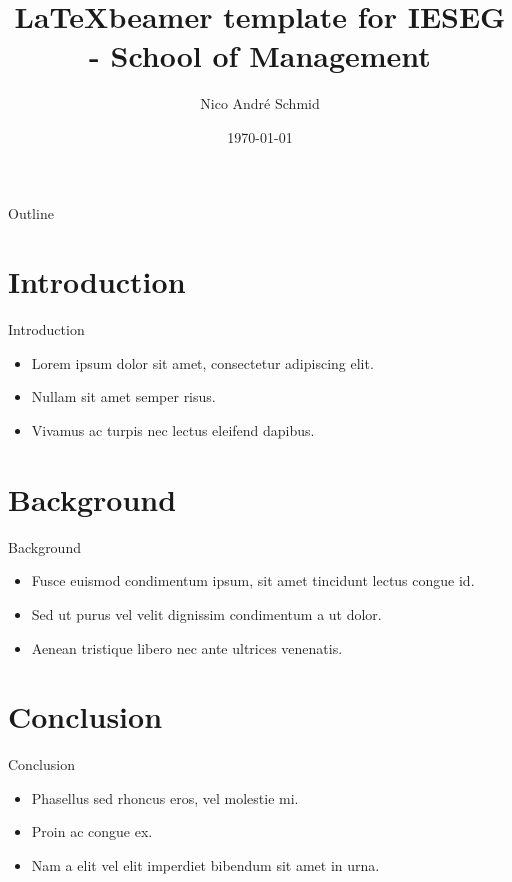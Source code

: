 \documentclass{beamer}
\title{\LaTeX beamer template for IESEG - School of Management}
\author{Nico André Schmid}
\date{\today}
\begin{document}
\begin{frame}
  \titlepage
\end{frame}

\begin{frame}{Outline}
  \tableofcontents
\end{frame}

\section{Introduction}

\begin{frame}{Introduction}
  \begin{itemize}
    \item Lorem ipsum dolor sit amet, consectetur adipiscing elit.
    \item Nullam sit amet semper risus.
    \item Vivamus ac turpis nec lectus eleifend dapibus.
  \end{itemize}
\end{frame}

\section{Background}

\begin{frame}{Background}
  \begin{itemize}
    \item Fusce euismod condimentum ipsum, sit amet tincidunt lectus congue id.
    \item Sed ut purus vel velit dignissim condimentum a ut dolor.
    \item Aenean tristique libero nec ante ultrices venenatis.
  \end{itemize}
\end{frame}

\section{Conclusion}
\begin{frame}{Conclusion}
  \begin{itemize}
    \item Phasellus sed rhoncus eros, vel molestie mi.
    \item Proin ac congue ex.
    \item Nam a elit vel elit imperdiet bibendum sit amet in urna.
  \end{itemize}
\end{frame}
\end{document}
